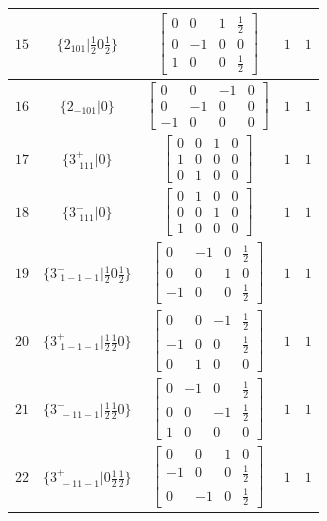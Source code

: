 \documentclass[fleqn,8pt]{jsarticle}
\begin{document}
\begin{longtable}{ccccc}
$ 15 $ & $ \{2{}_{101}|\frac{1}{2} 0 \frac{1}{2}\} $ & $ \begin{bmatrix} 0 & 0 & 1 & \frac{1}{2} \\ 0 & -1 & 0 & 0 \\ 1 & 0 & 0 & \frac{1}{2} \end{bmatrix} $ & $ 1 $ & $ 1 $ \\ \hline
$ 16 $ & $ \{2{}_{-101}|0\} $ & $ \begin{bmatrix} 0 & 0 & -1 & 0 \\ 0 & -1 & 0 & 0 \\ -1 & 0 & 0 & 0 \end{bmatrix} $ & $ 1 $ & $ 1 $ \\ \hline
$ 17 $ & $ \{3^{+}_{\,\,111}|0\} $ & $ \begin{bmatrix} 0 & 0 & 1 & 0 \\ 1 & 0 & 0 & 0 \\ 0 & 1 & 0 & 0 \end{bmatrix} $ & $ 1 $ & $ 1 $ \\ \hline
$ 18 $ & $ \{3^{-}_{\,\,111}|0\} $ & $ \begin{bmatrix} 0 & 1 & 0 & 0 \\ 0 & 0 & 1 & 0 \\ 1 & 0 & 0 & 0 \end{bmatrix} $ & $ 1 $ & $ 1 $ \\ \hline
$ 19 $ & $ \{3^{-}_{\,\,1-1-1}|\frac{1}{2} 0 \frac{1}{2}\} $ & $ \begin{bmatrix} 0 & -1 & 0 & \frac{1}{2} \\ 0 & 0 & 1 & 0 \\ -1 & 0 & 0 & \frac{1}{2} \end{bmatrix} $ & $ 1 $ & $ 1 $ \\ \hline
$ 20 $ & $ \{3^{+}_{\,\,1-1-1}|\frac{1}{2} \frac{1}{2} 0\} $ & $ \begin{bmatrix} 0 & 0 & -1 & \frac{1}{2} \\ -1 & 0 & 0 & \frac{1}{2} \\ 0 & 1 & 0 & 0 \end{bmatrix} $ & $ 1 $ & $ 1 $ \\ \hline
$ 21 $ & $ \{3^{-}_{\,\,-11-1}|\frac{1}{2} \frac{1}{2} 0\} $ & $ \begin{bmatrix} 0 & -1 & 0 & \frac{1}{2} \\ 0 & 0 & -1 & \frac{1}{2} \\ 1 & 0 & 0 & 0 \end{bmatrix} $ & $ 1 $ & $ 1 $ \\ \hline
$ 22 $ & $ \{3^{+}_{\,\,-11-1}|0 \frac{1}{2} \frac{1}{2}\} $ & $ \begin{bmatrix} 0 & 0 & 1 & 0 \\ -1 & 0 & 0 & \frac{1}{2} \\ 0 & -1 & 0 & \frac{1}{2} \end{bmatrix} $ & $ 1 $ & $ 1 $ \\ \hline

\end{longtable}
\end{document}
